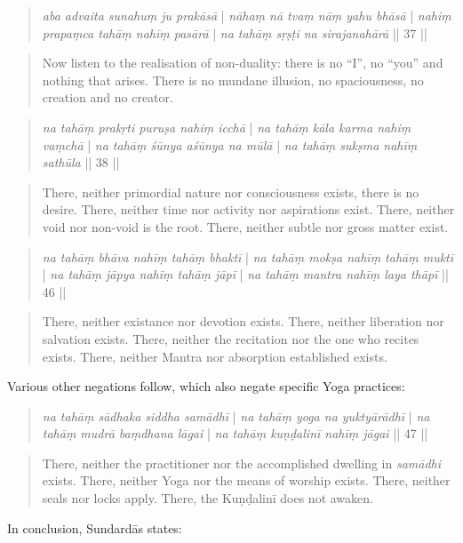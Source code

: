 \begin{quote}
\textit{aba advaita sunahuṃ ju prakāsā} | \textit{nāhaṃ nā tvaṃ nāṃ yahu bhāsā} |
\textit{nahiṃ prapaṃca tahāṃ nahīṃ pasārā} | \textit{na tahāṃ sṛṣṭi na sirajanahārā} || 37 ||
\end{quote}
\begin{quote}
Now listen to the realisation of non-duality: there is no ``I'', no ``you'' and nothing that arises. There is no mundane illusion, no spaciousness, no creation and no creator.
\end{quote}
\begin{quote}
\textit{na tahāṃ prakṛti puruṣa nahiṃ icchā} | \textit{na tahāṃ kāla karma nahiṃ vaṃchā} |
\textit{na tahāṃ śūnya aśūnya na mūlā} | \textit{na tahāṃ sukṣma nahīṃ sathūla} || 38 ||
\end{quote}
\begin{quote}
There, neither primordial nature nor consciousness exists, there is no desire. There, neither time nor activity nor aspirations exist. There, neither void nor non-void is the root. There, neither subtle nor gross matter exist.
\end{quote}
\begin{quote}
\textit{na tahāṃ bhāva nahīṃ tahāṃ bhaktī} | \textit{na tahāṃ mokṣa nahīṃ tahāṃ muktī} |
\textit{na tahāṃ jāpya nahīṃ tahāṃ jāpī} | \textit{na tahāṃ mantra nahīṃ laya thāpī} || 46 || 
\end{quote}
\begin{quote}
There, neither existance nor devotion exists. There, neither liberation nor salvation exists. There, neither the recitation nor the one who recites exists. There, neither Mantra nor absorption established exists.
\end{quote}

Various other negations follow, which also negate specific Yoga practices:
\begin{quote}
\textit{na tahāṃ sādhaka siddha samādhī} | \textit{na tahāṃ yoga na yuktyārādhī} | 
\textit{na tahāṃ mudrā baṃdhana lāgai} | \textit{na tahāṃ kuṇḍalinī nahīṃ jāgai} || 47 ||
\end{quote}
\begin{quote}
There, neither the practitioner nor the accomplished dwelling in \textit{samādhi} exists. There, neither Yoga nor the means of worship exists. There, neither seals nor locks apply. There, the Kuṇḍalinī does not awaken. 
\end{quote}

In conclusion, Sundardās states:

